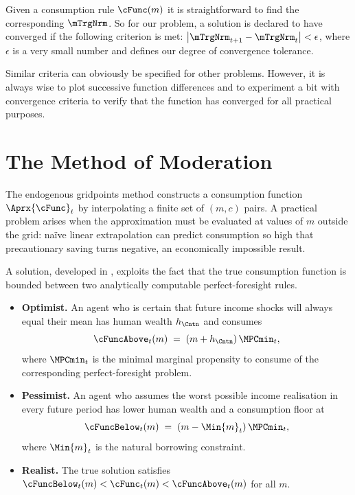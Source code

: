 \documentclass[titlepage, headings=optiontotocandhead]{econark}
\begin{document}
{Given a consumption rule $\cFunc(m)$ it is straightforward to find
the corresponding $\mTrgNrm$.  So for our problem, a solution is declared
to have converged if the following criterion is met:
$\left|\mTrgNrm_{t+1}-\mTrgNrm_{t}\right| < \epsilon$, where $\epsilon$ is
a very small number and defines our degree of convergence tolerance.

Similar criteria can obviously be specified for other problems.
However, it is always wise to plot successive function differences and
to experiment a bit with convergence criteria to verify that the
function has converged for all practical purposes.



}
\hypertarget{method-of-moderation}{}
\section{The Method of Moderation}\label{sec:method-of-moderation}

The endogenous gridpoints method constructs a consumption function
$\Aprx{\cFunc}_{t}$ by interpolating a finite set of
$(m,c)$ pairs.  A practical problem arises when the
approximation must be evaluated at values of $m$ outside the
grid: na\"ive linear extrapolation can predict consumption so high
that precautionary saving turns negative, an economically impossible
result.

A solution, developed in \cite{method-of-moderation}, exploits the fact that the
true consumption function is bounded between two analytically
computable perfect-foresight rules.
\begin{itemize}
  \item \textbf{Optimist.} An agent who is certain that future income
  shocks will always equal their mean has human wealth
  $h_{\Cntn}$ and consumes
  \begin{equation}
    \cFuncAbove_{t}(m) \;=\;
      (m + h_{\Cntn})\,\MPCmin_{t},
      \label{eq:cFuncAboveBrief}
  \end{equation}
  where $\MPCmin_{t}$ is the minimal marginal propensity to
  consume of the corresponding perfect-foresight problem.
  \item \textbf{Pessimist.} An agent who assumes the worst possible
  income realisation in every future period has lower human wealth and
  a consumption floor at
  \begin{equation}
    \cFuncBelow_{t}(m) \;=\;
      (m - \Min{m}_{t})\,\MPCmin_{t},
      \label{eq:cFuncBelowBrief}
  \end{equation}
  where $\Min{m}_{t}$ is the natural borrowing constraint.
  \item \textbf{Realist.}  The true solution satisfies
  $\cFuncBelow_{t}(m) < \cFunc_{t}(m) <
  \cFuncAbove_{t}(m)$ for all $m$.
\end{itemize}
\end{document}
